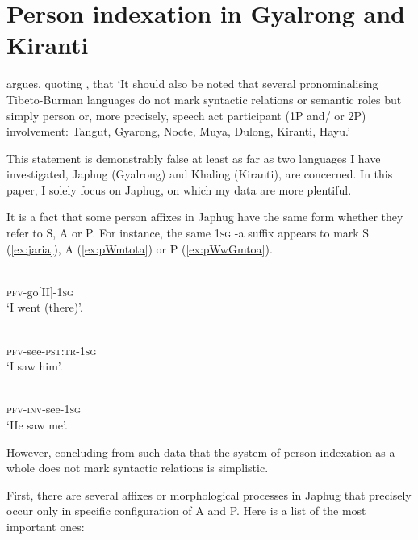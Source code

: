 \documentclass[oldfontcommands,oneside,a4paper,11pt]{article}
\newcommand{\ipa}[1]{{\phon \mbox{#1}}} %
\begin{document}
\section{Person indexation in Gyalrong and Kiranti} \label{sec:rgyalrong}
\citet[53]{zeisler15eat} argues, quoting \citet[308]{lapolla92}, that `It should also be noted that several pronominalising Tibeto-Burman languages do not mark syntactic relations or semantic roles but simply person or, more precisely, speech act participant (1P and/ or 2P) involvement: Tangut, Gyarong, Nocte, Muya, Dulong, Kiranti, Hayu.'

This statement is demonstrably false at least as far as two languages I have investigated, Japhug (Gyalrong) and Khaling (Kiranti), are concerned. In this paper, I solely focus on Japhug, on which my data are more plentiful.

It is a fact that some person affixes in Japhug have the same form whether they refer to S, A or P. For instance, the same \textsc{1sg} \ipa{-a} suffix appears to mark S (\ref{ex:jaria}), A (\ref{ex:pWmtota}) or P (\ref{ex:pWwGmtoa}).

\begin{exe}
\ex \label{ex:jaria}
\gll \ipa{jɤ-ari-a} \\
\textsc{pfv}-go[II]-\textsc{1sg} \\
\glt `I went (there)'.
\end{exe}

\begin{exe}
\ex \label{ex:pWmtota}
\gll \ipa{pɯ-mto-t-a} \\
\textsc{pfv}-see-\textsc{pst:tr}-\textsc{1sg} \\
\glt `I saw him'.
\end{exe}


\begin{exe}
\ex \label{ex:pWwGmtoa}
\gll \ipa{pɯ́-wɣ-mto-a} \\
\textsc{pfv}-\textsc{inv}-see-\textsc{1sg} \\
\glt `He saw me'.
\end{exe}

However, concluding from such data that the system of person indexation as a whole does not mark syntactic relations is simplistic.

First, there are several affixes or morphological processes in Japhug that precisely occur only in specific configuration of A and P. Here is a list of the most important ones:
\end{document}
